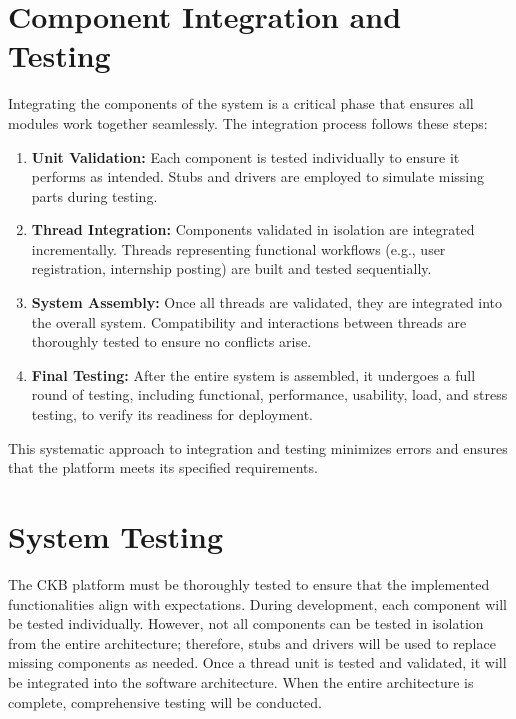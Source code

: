 \section{Component Integration and Testing\label{sec:integration}}

Integrating the components of the system is a critical phase that ensures all modules work together seamlessly. The integration process follows these steps:

\begin{enumerate}
    \item \textbf{Unit Validation:} Each component is tested individually to ensure it performs as intended. Stubs and drivers are employed to simulate missing parts during testing.
    \item \textbf{Thread Integration:} Components validated in isolation are integrated incrementally. Threads representing functional workflows (e.g., user registration, internship posting) are built and tested sequentially.
    \item \textbf{System Assembly:} Once all threads are validated, they are integrated into the overall system. Compatibility and interactions between threads are thoroughly tested to ensure no conflicts arise.
    \item \textbf{Final Testing:} After the entire system is assembled, it undergoes a full round of testing, including functional, performance, usability, load, and stress testing, to verify its readiness for deployment.
\end{enumerate}

This systematic approach to integration and testing minimizes errors and ensures that the platform meets its specified requirements.

\section{System Testing\label{sec:system_testing}}

The CKB platform must be thoroughly tested to ensure that the implemented functionalities align with expectations. During development, each component will be tested individually. However, not all components can be tested in isolation from the entire architecture; therefore, stubs and drivers will be used to replace missing components as needed. Once a thread unit is tested and validated, it will be integrated into the software architecture. When the entire architecture is complete, comprehensive testing will be conducted.

